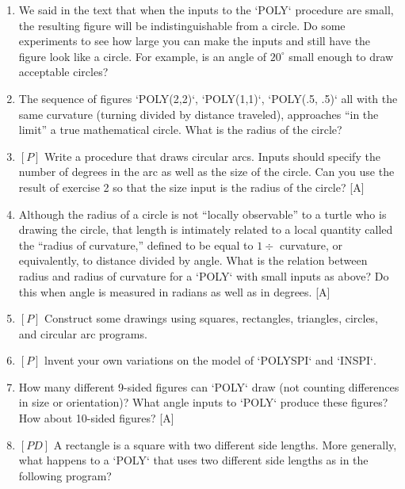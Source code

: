 \documentclass{book}
\begin{document}
\begin{enumerate}
\item We said in the text that when the inputs to the \textsc{`POLY`} 
procedure are small, the resulting figure will be indistinguishable from a circle. Do
some experiments to see how large you can make the inputs and still
have the figure look like a circle. For example, is an angle of $20^{\circ}$ 
small enough to draw acceptable circles?

\item The sequence of figures \textsc{`POLY(2,2)`}, \textsc{`POLY(1,1)`}, \textsc{`POLY(.5, .5)`}
all with the same curvature (turning divided by distance traveled), approaches ``in the limit'' a true mathematical circle. What is the radius
of the circle?  
\item $[P]$ Write a procedure that draws circular arcs. Inputs should specify
the number of degrees in the arc as well as the size of the circle. Can
you use the result of exercise 2 so that the size input is the radius of the
circle? [A]
\item Although the radius of a circle is not ``locally observable'' to a turtle
who is drawing the circle, that length is intimately related to a local
quantity called the ``radius of curvature,'' defined to be equal to $1 \div$
curvature, or equivalently, to distance divided by angle. What is the
relation between radius and radius of curvature for a \textsc{`POLY`} with small
inputs as above? Do this when angle is measured in radians as well as
in degrees. [A]
\item $[P]$ Construct some drawings using squares, rectangles, triangles,
circles, and circular arc programs.
\item $[P]$ lnvent your own variations on the model of \textsc{`POLYSPI`} and \textsc{`INSPI`}.
\item How many different 9-sided figures can \textsc{`POLY`} draw (not counting
differences in size or orientation)? What angle inputs to \textsc{`POLY`} produce
these figures? How about 10-sided figures? [A]
\item $[PD]$ A rectangle is a square with two different side lengths. More
generally, what happens to a \textsc{`POLY`} that uses two different side lengths
as in the following program?


\end{enumerate}
\end{document}
